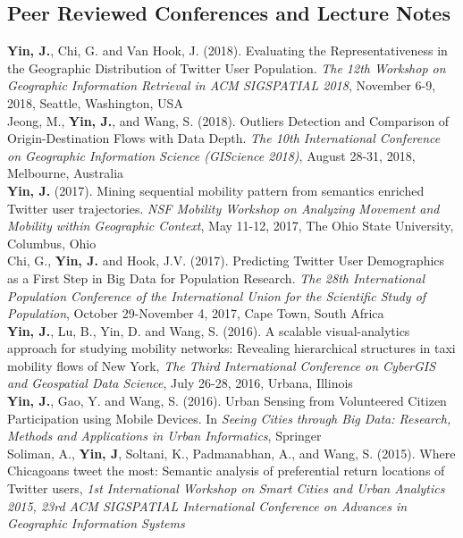 \documentclass[11pt, a4paper]{article}
\newcommand{\years}[1]{\marginnote{\scriptsize #1}}
\begin{document}
\subsection*{Peer Reviewed Conferences and Lecture Notes}
\noindent
\years{2018}\textbf{Yin, J.}, Chi, G. and Van Hook, J. (2018). Evaluating the Representativeness in the Geographic Distribution of Twitter User Population. \textit{The 12th Workshop on Geographic Information Retrieval in ACM SIGSPATIAL 2018}, November 6-9, 2018, Seattle, Washington, USA\\
\years{2018}Jeong, M., \textbf{Yin, J.}, and Wang, S. (2018). Outliers Detection and Comparison of Origin-Destination Flows with Data Depth. \textit{The 10th International Conference on Geographic Information Science (GIScience 2018)}, August 28-31, 2018, Melbourne, Australia\\
\years{2017}\textbf{Yin, J.} (2017). Mining sequential mobility pattern from semantics enriched Twitter user trajectories. \textit{NSF Mobility Workshop on Analyzing Movement and Mobility within Geographic Context}, May 11-12, 2017, The Ohio State University, Columbus, Ohio\\
\years{2017}Chi, G., \textbf{Yin, J.} and Hook, J.V. (2017). Predicting Twitter User Demographics as a First Step in Big Data for Population Research. \textit{The 28th International Population Conference of the International Union for the Scientific Study of Population}, October 29-November 4, 2017, Cape Town, South Africa\\
\years{2016}\textbf{Yin, J.}, Lu, B., Yin, D. and Wang, S. (2016). A scalable visual-analytics approach for studying mobility networks: Revealing hierarchical structures in taxi mobility flows of New York, \textit{The Third International Conference on CyberGIS and Geospatial Data Science}, July 26-28, 2016, Urbana, Illinois\\
\years{2016}\textbf{Yin, J.}, Gao, Y. and Wang, S. (2016). Urban Sensing from Volunteered Citizen Participation using Mobile Devices. In \emph{Seeing Cities through Big Data: Research, Methods and Applications in Urban Informatics}, Springer\\
\years{2015}Soliman, A., \textbf{Yin, J}, Soltani, K., Padmanabhan, A., and Wang, S. (2015). Where Chicagoans tweet the most: Semantic analysis of preferential return locations of Twitter users, \textit{1st International Workshop on Smart Cities and Urban Analytics 2015, 23rd ACM SIGSPATIAL International Conference on Advances in Geographic Information Systems}\\ 
\end{document}
